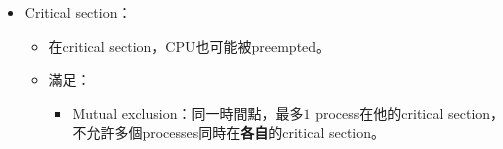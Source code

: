 \begin{itemize}
\begin{itemize}
\begin{equation}
\begin{aligned}
                & \sum_{i = 1}^{n} Max_i < n + m
            \end{aligned}
        \end{equation} 則NO deadlock。\\ \begin{proof}
            若所有資源都分配給processes，即\begin{equation}
                \sum_{i = 1}^{n} Allocation_i = m
            \end{equation} 又\begin{equation}
                \begin{aligned}
                    & \sum_{i = 1}^{n} Need_i = \sum_{i = 1}^{n} Max_i - \sum_{i = 1}^{n} Allocation_i \\
                    \rightarrow & \sum_{i = 1}^{n} Max_i = \sum_{i = 1}^{n} Need_i + m
                \end{aligned}
            \end{equation}
            根據第二條件，有\begin{equation}
                \begin{aligned}
                    & \sum_{i = 1}^{n} Max_i < n + m \\
                    \rightarrow & \sum_{i = 1}^{n} Need_i < n
                \end{aligned}
            \end{equation}$\exists$ process $P_i$，$Need_i = 0$，又\begin{equation}
                \begin{aligned}
                    & Max_i \ge 1 \land Need_i = 0 \\
                    \rightarrow & Allocation_i \ge 1
                \end{aligned}
            \end{equation}在$P_i$完工後，會產生$\ge 1$ resources給其他processes使用，又可以使$\ge 1$ processes $P_j$有$Need_j = 0$，依此類推，所有processes皆可完工。
        \end{proof}
    \end{itemize}
    \item Critical section： \begin{itemize}
        \item 在critical section，CPU也可能被preempted。
        \item 滿足：\begin{itemize}
            \item Mutual exclusion：同一時間點，最多$1$ process在他的critical section，不允許多個processes同時在\textbf{各自}的critical section。

\end{itemize}
\end{itemize}
\end{itemize}

